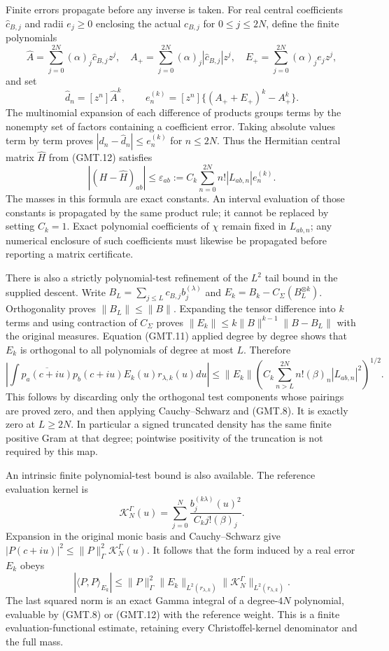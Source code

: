 \documentclass[11pt]{article}
\begin{document}
Finite errors propagate before any inverse is taken. For real central
coefficients $\widehat c_{B,j}$ and radii $e_j\ge0$ enclosing the actual
$c_{B,j}$ for $0\le j\le2N$, define the finite polynomials
\[
 \widehat A=\sum_{j=0}^{2N}(\alpha)_j\widehat c_{B,j}z^j,
 \quad A_+=\sum_{j=0}^{2N}(\alpha)_j|\widehat c_{B,j}|z^j,
 \quad E_+=\sum_{j=0}^{2N}(\alpha)_je_jz^j,
\]
and set
\[
 \widehat d_n=[z^n]\widehat A^k,\qquad
 e^{(k)}_n=[z^n]\{(A_++E_+)^k-A_+^k\}.                         \tag{GMT.14}
\]
The multinomial expansion of each difference of products groups terms
by the nonempty set of factors containing a coefficient error. Taking
absolute values term by term proves
$|d_n-\widehat d_n|\le e^{(k)}_n$ for $n\le2N$. Thus the Hermitian
central matrix $\widehat H$ from (GMT.12) satisfies
\[
 |(H-\widehat H)_{ab}|\le
 \varepsilon_{ab}:=C_k\sum_{n=0}^{2N}n!|L_{ab,n}|e^{(k)}_n.
                                                                    \tag{GMT.15}
\]
The masses in this formula are exact constants. An interval evaluation
of those constants is propagated by the same product rule; it cannot
be replaced by setting $C_k=1$. Exact polynomial coefficients of
$\chi$ remain fixed in $L_{ab,n}$; any numerical enclosure of such
coefficients must likewise be propagated before reporting a matrix
certificate.

There is also a strictly polynomial-test refinement of the $L^2$ tail
bound in the supplied descent. Write
$B_L=\sum_{j\le L}c_{B,j}b_j^{(\lambda)}$ and
$E_k=B_k-C_\Sigma(B_L^{\otimes k})$. Orthogonality proves
$\|B_L\|\le\|B\|$. Expanding the tensor difference into $k$ terms
and using contraction of $C_\Sigma$ proves
$\|E_k\|\le k\|B\|^{k-1}\|B-B_L\|$ with the original measures.
Equation (GMT.11) applied degree by degree shows that $E_k$ is
orthogonal to all polynomials of degree at most $L$. Therefore
\[
 \left|\int\overline{p_a(c+iu)}p_b(c+iu)E_k(u)r_{\lambda,k}(u)du\right|
 \le\|E_k\|
 \left(C_k\sum_{n>L}^{2N}n!(\beta)_n|L_{ab,n}|^2\right)^{1/2}.
                                                                    \tag{GMT.16}
\]
This follows by discarding only the orthogonal test components whose
pairings are proved zero, and then applying Cauchy--Schwarz and
(GMT.8). It is exactly zero at $L\ge2N$. In particular a signed
truncated density has the same finite positive Gram at that degree;
pointwise positivity of the truncation is not required by this map.

An intrinsic finite polynomial-test bound is also available. The
reference evaluation kernel is
\[
 \mathcal K_N^\Gamma(u)=
       \sum_{j=0}^N\frac{b_j^{(k\lambda)}(u)^2}{C_kj!(\beta)_j}.
\]
Expansion in the original monic basis and Cauchy--Schwarz give
$|P(c+iu)|^2\le\|P\|_\Gamma^2\mathcal K_N^\Gamma(u)$.
It follows that the form induced by a real error $E_k$ obeys
\[
 |\langle P,P\rangle_{E_k}|
 \le\|P\|_\Gamma^2\|E_k\|_{L^2(r_{\lambda,k})}
       \|\mathcal K_N^\Gamma\|_{L^2(r_{\lambda,k})}.             \tag{GMT.17}
\]
The last squared norm is an exact Gamma integral of a degree-$4N$
polynomial, evaluable by (GMT.8) or (GMT.12) with the reference weight.
This is a finite evaluation-functional estimate, retaining every
Christoffel-kernel denominator and the full mass.
\end{document}
